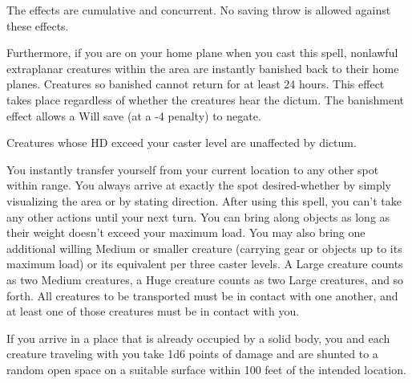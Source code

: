 \begin{multicols}{2}
\begin{small}
\smallskip\noindent The effects are cumulative and concurrent. No saving throw is allowed against these effects.


\smallskip\noindent Furthermore, if you are on your home plane when you cast this spell, nonlawful extraplanar creatures within the area are instantly banished back to their home planes. Creatures so banished cannot return for at least 24 hours. This effect takes place regardless of whether the creatures hear the dictum. The banishment effect allows a Will save (at a -4 penalty) to negate.

\smallskip\noindent Creatures whose HD exceed your caster level are unaffected by dictum.

\noindent You instantly transfer yourself from your current location to any other spot within range. You always arrive at exactly the spot desired-whether by simply visualizing the area or by stating direction. After using this spell, you can't take any other actions until your next turn. You can bring along objects as long as their weight doesn't exceed your maximum load. You may also bring one additional willing Medium or smaller creature (carrying gear or objects up to its maximum load) or its equivalent per three caster levels. A Large creature counts as two Medium creatures, a Huge creature counts as two Large creatures, and so forth. All creatures to be transported must be in contact with one another, and at least one of those creatures must be in contact with you.

\smallskip\noindent If you arrive in a place that is already occupied by a solid body, you and each creature traveling with you take 1d6 points of damage and are shunted to a random open space on a suitable surface within 100 feet of the intended location.


\end{small}
\end{multicols}
